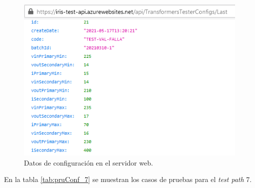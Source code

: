 \begin{figure}[htpb]
	\centering
	\includegraphics[scale=1]{./Figures/serv_web_falla_conf.png}
	\caption{Datos de configuración en el servidor web.}
	\label{fig:serv_web_conf}
\end{figure}

En la tabla \ref{tab:pruConf_7} se muestran los casos de pruebas para el \textit{test path} 7.

